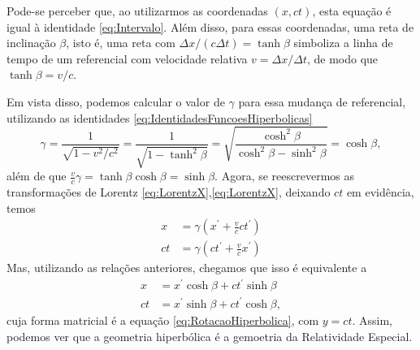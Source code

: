 Pode-se perceber que, ao utilizarmos as coordenadas $(x,ct)$, esta equação é igual à identidade \eqref{eq:Intervalo}. Além disso, para essas coordenadas, uma reta de inclinação $\beta$, isto é, uma reta com $\Delta x/(c\Delta t)=\tanh\beta$ simboliza a linha de tempo de um referencial com velocidade relativa $v = \Delta x/\Delta t$, de modo que $\tanh\beta=v/c$.

Em vista disso, podemos calcular o valor de $\gamma$ para essa mudança de referencial, utilizando as identidades \eqref{eq:IdentidadesFuncoesHiperbolicas}
\[
    \gamma = \frac{1}{\sqrt{1-v^2/c^2}}=\frac{1}{\sqrt{1-\tanh^2\beta}}
    =\sqrt{\frac{\cosh^2\beta}{\cosh^2\beta-\sinh^2\beta}}=\cosh\beta ,
\]
além de que $\tfrac{v}{c}\gamma = \tanh\beta\cosh\beta=\sinh\beta$. Agora, se reescrevermos as transformações de Lorentz \eqref{eq:LorentzX},\eqref{eq:LorentzX}, deixando $ct$ em evidência, temos
\begin{equation}
\begin{aligned} x &=\gamma\left(x^{\prime}+\frac{v}{c} c t^{\prime}\right) \\ c t &=\gamma\left(c t^{\prime}+\frac{v}{c} x^{\prime}\right) \end{aligned}
\end{equation}
Mas, utilizando as relações anteriores, chegamos que isso é equivalente a
\begin{equation}
\begin{aligned} x &=x^{\prime} \cosh \beta+c t^{\prime} \sinh \beta \\ c t &=x^{\prime} \sinh \beta+c t^{\prime} \cosh \beta ,\end{aligned}
\end{equation}
cuja forma matricial é a equação \eqref{eq:RotacaoHiperbolica}, com $y=ct$. Assim, podemos ver que a geometria hiperbólica é a gemoetria da Relatividade Especial.
